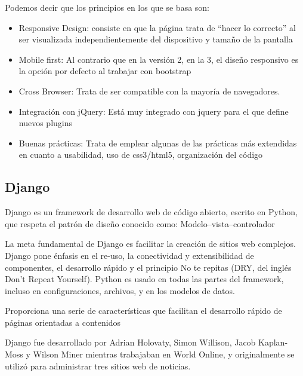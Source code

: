 Podemos decir que los principios en los que se basa son:
\setlength{\parskip}{0mm}
\begin{itemize}

	\item Responsive Design: consiste en que la página trata de “hacer lo correcto” al ser visualizada independientemente del dispositivo y tamaño de la pantalla
	
	\item Mobile first: Al contrario que en la versión 2, en la 3, el diseño responsivo es la opción por defecto al trabajar con bootstrap

	\item Cross Browser: Trata de ser compatible con la mayoría de navegadores.
	
	\item Integración con jQuery: Está muy integrado con jquery para el que define nuevos plugins

	\item Buenas prácticas: Trata de emplear algunas de las prácticas más extendidas en cuanto a usabilidad, uso de css3/html5, organización del código
	
	
\end{itemize}

\subsection{Django}
\setlength{\parskip}{5mm}
Django es un framework de desarrollo web de código abierto, escrito en Python, que respeta el patrón de diseño conocido como: Modelo–vista–controlador

La meta fundamental de Django es facilitar la creación de sitios web complejos. Django pone énfasis en el re-uso, la conectividad y extensibilidad de componentes, el desarrollo rápido y el principio No te repitas (DRY, del inglés Don't Repeat Yourself). Python es usado en todas las partes del framework, incluso en configuraciones, archivos, y en los modelos de datos.

Proporciona una serie de características que facilitan el desarrollo rápido de páginas orientadas a contenidos

Django fue desarrollado por Adrian Holovaty, Simon Willison, Jacob Kaplan-Moss y Wilson Miner mientras trabajaban en World Online, y originalmente se utilizó para administrar tres sitios web de noticias.

